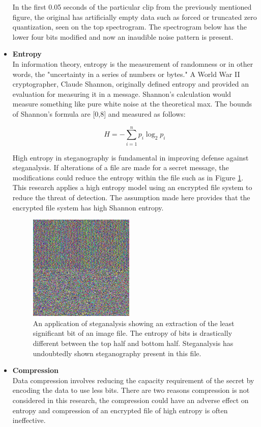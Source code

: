 \documentclass[letterpaper]{article}
\begin{document}
\begin{itemize}
In the first 0.05 seconds of the particular clip from the previously mentioned figure, the original has artificially empty data such as forced or truncated zero quantization, seen on the top spectrogram. The spectrogram below has the lower four bits modified and now an inaudible noise pattern is present.    


\item \textbf{Entropy}\\
In information theory, entropy is the measurement of randomness or in other words, the "uncertainty in a series of numbers or bytes."\cite{clausius1976application} A World War II cryptographer, Claude Shannon, originally defined entropy and provided an evaluation for measuring it in a message. Shannon's calculation would measure something like pure white noise at the theoretical max.\cite{shannon2001mathematical} The bounds of Shannon's formula are [0,8] and measured as follows:

$$ H = -\sum_{i=1}^{n} p_i \log_2 p_i$$

High entropy in steganography is fundamental in improving defense against steganalysis. If alterations of a file are made for a secret message, the modifications could reduce the entropy within the file such as in Figure \ref{fig:steganal}. This research applies a high entropy model using an encrypted file system to reduce the threat of detection. The assumption made here provides that the encrypted file system has high Shannon entropy. \cite{dodis2005entropic}
 
\begin{figure}[t]
    \centering
    \includegraphics[width=5cm]{images/lena_lsb.png}
    \caption{An application of steganalysis showing an extraction of the least significant bit of an image file. The entropy of bits is drastically different between the top half and bottom half. Steganalysis has undoubtedly shown steganography present in this file. 
 }
    \label{fig:steganal}
\end{figure}

\item \textbf{Compression}\\
Data compression involves reducing the capacity requirement of the secret by encoding the data to use less bits. There are two reasons compression is not considered in this research, the compression could have an adverse effect on entropy and compression of an encrypted file of high entropy is often ineffective.  \cite{shannon2001mathematical}


\end{itemize}
\end{document}
